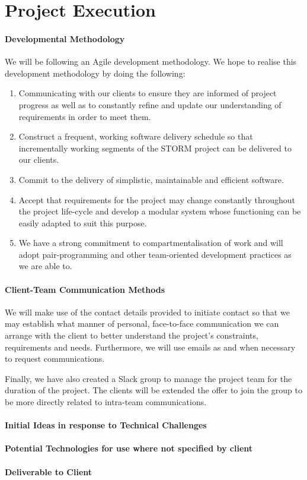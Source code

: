 \documentclass[12pt]{article}
\begin{document}
\section{Project Execution}
\paragraph{Developmental Methodology}
We will be following an Agile development methodology. We hope to realise this development methodology by doing the following:
\begin{enumerate}
\item Communicating with our clients to ensure they are informed of project progress as well as to constantly refine and update our understanding of requirements in order to meet them.
\item Construct a frequent, working software delivery schedule so that incrementally working segments of the STORM project can be delivered to our clients.
\item Commit to the delivery of simplistic, maintainable and efficient software.
\item Accept that requirements for the project may change constantly throughout the project life-cycle and develop a modular system whose functioning can be easily adapted to suit this purpose.
\item We have a strong commitment to compartmentalisation of work and will adopt pair-programming and other team-oriented development practices as we are able to.
\end{enumerate}

\paragraph{Client-Team Communication Methods}
We will make use of the contact details provided to initiate contact so that we may establish what manner of personal, face-to-face communication we can arrange with the client to better understand the project's constraints, requirements and needs. Furthermore, we will use emails as and when necessary to request communications.

Finally, we have also created a Slack group to manage the project team for the duration of the project. The clients will be extended the offer to join the group to be more directly related to intra-team communications.
\paragraph{Initial Ideas in response to Technical Challenges}
\paragraph{Potential Technologies for use where not specified by client}
\paragraph{Deliverable to Client}
\end{document}
